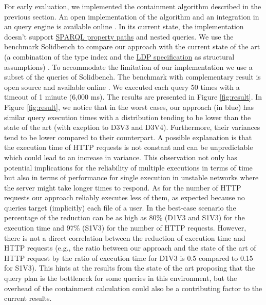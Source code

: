 For early evaluation, we implemented the containment algorithm described in the previous section.
An open implementation of the algorithm and an integration in an query engine is available online .
In its current state, the implementation doesn't support 
\href{https://www.w3.org/TR/sparql11-query/#propertypaths}{SPARQL property paths} and nested queries.
We use the benchmark Solidbench \cite{Taelman2023} to compare our approach with the current state of the art 
(a combination of the type index and the \href{https://www.w3.org/TR/ldp/}{LDP specification} as structural assumptions) \cite{Taelman2023}.
To accommodate the limitation of our implementation we use a subset of the queries of Solidbench.
The benchmark with complementary result is open source and available online .
We executed each query 50 times with a timeout of 1 minute (6,000 ms).
The results are presented in Figure \ref{fig:result}.
In Figure \ref{fig:result}, we notice that in the worst cases, our approach (in blue) has similar query execution times with a 
distribution tending to be lower than the state of the art (with exeption to D3V3 and D3V4).
Furthermore, their variances tend to be lower compared to their counterpart. 
A possible explanation is that the execution time of HTTP requests is not constant and can be unpredictable \cite{hartig2016walking}
which could lead to an increase in variance.
This observation not only has potential implications for the reliability of multiple executions in terms of time
but also in terms of performance for single execution in unstable networks where the server might take longer times to respond. 
As for the number of HTTP requests our approach reliably executes less of them, as expected because no
queries target (implicitly) each file of a user.
In the best-case scenario the percentage of the reduction can be as high as 80\% (D1V3 and S1V3) for the execution time 
and 97\% (S1V3) for the number of HTTP requests.
However, there is not a direct correlation between the reduction of execution time and HTTP requests (e.g., the ratio 
between our approach and the state of the art of HTTP request by the ratio of execution time for D1V3 is 0.5 compared to 0.15 for S1V3).
This hints at the results from the state of the art \cite{Taelman2023} proposing that the query plan is the bottleneck for some queries in this environment,
but the overhead of the containment calculation could also be a contributing factor to the current results.

  